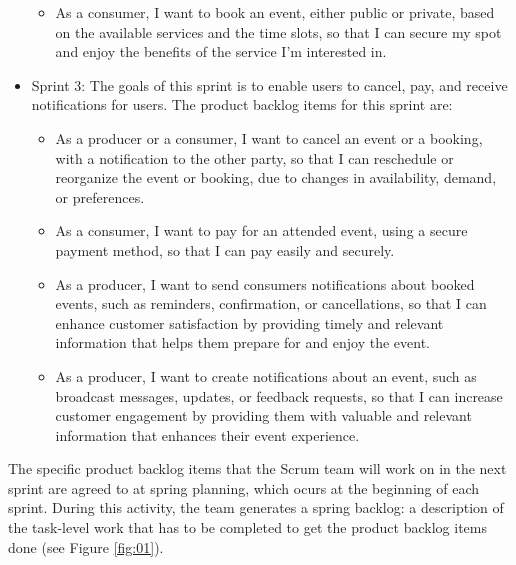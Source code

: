 \documentclass[a4paper,12pt]{article}
\begin{document}
\begin{itemize}
\begin{itemize}
			\item As a consumer, I want to book an event, either public or private, based on the available services and the time slots, so that I can secure my spot and enjoy the benefits of the service I'm interested in.
		\end{itemize}
	\vspace{-0.3cm}
	\item Sprint 3: The goals of this sprint is to enable users to cancel, pay, and receive notifications for users. The product backlog items for this sprint are:
		\begin{itemize}
			\vspace{-0.3cm}
			\item As a producer or a consumer, I want to cancel an event or a booking, with a notification to the other party, so that I can reschedule or reorganize the event or booking, due to changes in availability, demand, or preferences.
			\vspace{-0.2cm}
			\item As a consumer, I want to pay for an attended event, using a secure payment method, so that I can pay easily and securely.
			\vspace{-0.2cm}
			\item As a producer, I want to send consumers notifications about booked events, such as reminders, confirmation, or cancellations, so that I can enhance customer satisfaction by providing timely and relevant information that helps them prepare for and enjoy the event.
			\item As a producer, I want to create notifications about an event, such as broadcast messages, updates, or feedback requests, so that I can increase customer engagement by providing them with valuable and relevant information that enhances their event experience.
		\end{itemize}
\end{itemize}
The specific product backlog items that the Scrum team will work on in the next sprint are agreed to at spring planning, which ocurs at the beginning of each sprint. During this activity, the team generates a spring backlog: a description of the task-level work that has to be completed to get the product backlog items done (see Figure \ref{fig:01}).
\end{document}
